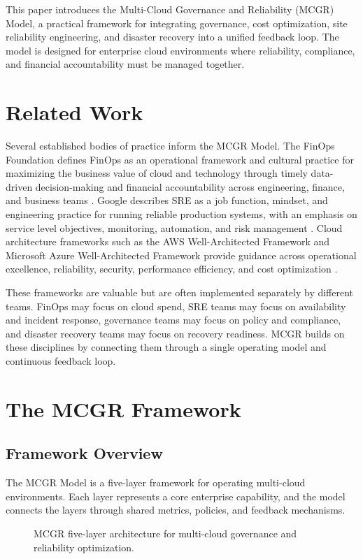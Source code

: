 \documentclass[conference]{IEEEtran}
\begin{document}
This paper introduces the Multi-Cloud Governance and Reliability (MCGR) Model, a practical framework for integrating governance, cost optimization, site reliability engineering, and disaster recovery into a unified feedback loop. The model is designed for enterprise cloud environments where reliability, compliance, and financial accountability must be managed together.

\section{Related Work}
Several established bodies of practice inform the MCGR Model. The FinOps Foundation defines FinOps as an operational framework and cultural practice for maximizing the business value of cloud and technology through timely data-driven decision-making and financial accountability across engineering, finance, and business teams \cite{finopsframework,msfinops}. Google describes SRE as a job function, mindset, and engineering practice for running reliable production systems, with an emphasis on service level objectives, monitoring, automation, and risk management \cite{googlesre,googlesrebook}. Cloud architecture frameworks such as the AWS Well-Architected Framework and Microsoft Azure Well-Architected Framework provide guidance across operational excellence, reliability, security, performance efficiency, and cost optimization \cite{awswa,azurewa}.

These frameworks are valuable but are often implemented separately by different teams. FinOps may focus on cloud spend, SRE teams may focus on availability and incident response, governance teams may focus on policy and compliance, and disaster recovery teams may focus on recovery readiness. MCGR builds on these disciplines by connecting them through a single operating model and continuous feedback loop.

\section{The MCGR Framework}
\subsection{Framework Overview}
The MCGR Model is a five-layer framework for operating multi-cloud environments. Each layer represents a core enterprise capability, and the model connects the layers through shared metrics, policies, and feedback mechanisms.

\begin{figure}[!t]
\centering

\caption{MCGR five-layer architecture for multi-cloud governance and reliability optimization.}
\label{fig:mcgr_layers}
\end{figure}
\end{document}
